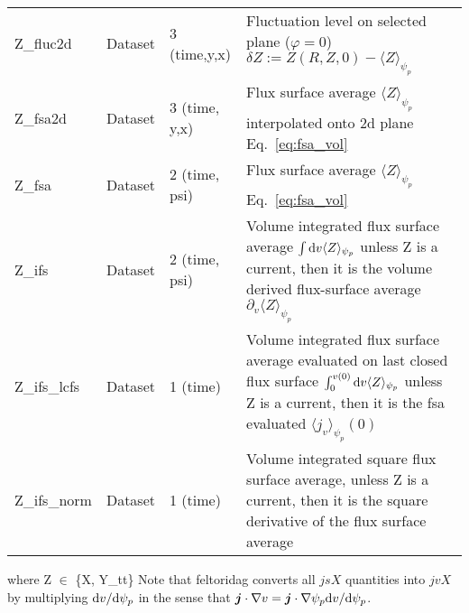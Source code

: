 \begin{longtable}{lll>{\RaggedRight}p{7cm}}
Z\_fluc2d        & Dataset & 3 (time,y,x) & Fluctuation level on selected plane ($\varphi= 0$) $\delta Z := Z(R,Z,0) - \langle Z\rangle_{\psi_{p}}$ \\
Z\_fsa2d         & Dataset & 3 (time, y,x) & Flux surface average $\langle Z\rangle_{\psi_p}$ interpolated onto 2d plane Eq.~\eqref{eq:fsa_vol} \\
Z\_fsa           & Dataset & 2 (time, psi) & Flux surface average $\langle Z\rangle_{\psi_p}$ Eq.~\eqref{eq:fsa_vol} \\
Z\_ifs           & Dataset & 2 (time, psi) & Volume integrated flux surface average $\int\mathrm{d} v\langle Z\rangle_{\psi_p}$ unless Z is a current, then it is the volume derived flux-surface average $\partial_v \langle Z\rangle_{\psi_p}$ \\
Z\_ifs\_lcfs     & Dataset & 1 (time) & Volume integrated flux surface average evaluated on last closed flux surface $\int_0^{v(0)}\mathrm{d} v\langle Z\rangle_{\psi_p}$ unless Z is a current, then it is the fsa evaluated $\langle j_v\rangle_{\psi_p}(0)$ \\
Z\_ifs\_norm     & Dataset & 1 (time) & Volume integrated square flux surface average, unless Z is a current, then it is the square derivative of the flux surface average \\
\bottomrule
\end{longtable}
where Z $\in$ \{X, Y\_tt\}
Note that feltoridag converts all $jsX$ quantities into $jvX$
by multiplying $\mathrm{d} v/\mathrm{d} \psi_p$
in the sense that ${\boldsymbol{j}}\cdot \nabla v  = {\boldsymbol{j}} \cdot \nabla \psi_p \mathrm{d} v/\mathrm{d}\psi_p$.








